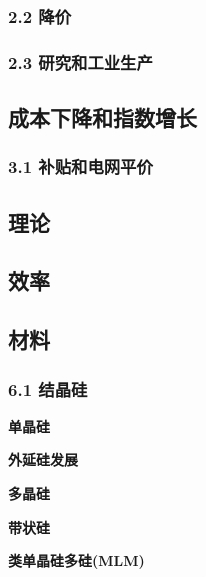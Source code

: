 \subsubsection{2.2 降价}



\subsubsection{2.3 研究和工业生产}



\subsection{成本下降和指数增长}



\subsubsection{3.1 补贴和电网平价}



\subsection{理论}



\subsection{效率}



\subsection{材料}



\subsubsection{6.1 结晶硅}



\textbf{单晶硅}



\textbf{外延硅发展}



\textbf{多晶硅}



\textbf{带状硅}



\textbf{类单晶硅多硅(MLM)}




